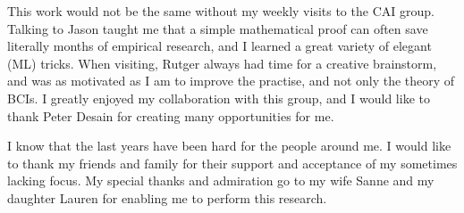 This work would not be the same without my weekly visits to the \ac{CAI} group.
Talking to Jason taught me that a simple mathematical proof can often save
literally months of empirical research, and I learned a great variety of
elegant (\acl{ML}) tricks. When visiting, Rutger always had time for a creative
brainstorm, and was as motivated as I am to improve the practise, and not only
the theory of \acp{BCI}. I greatly enjoyed my collaboration with this group,
and I would like to thank Peter Desain for creating many opportunities for me.

I know that the last years have been hard for the people around me. I would
like to thank my friends and family for their support and acceptance of my
sometimes lacking focus. My special thanks and admiration go to my wife Sanne
and my daughter Lauren for enabling me to perform this research.
